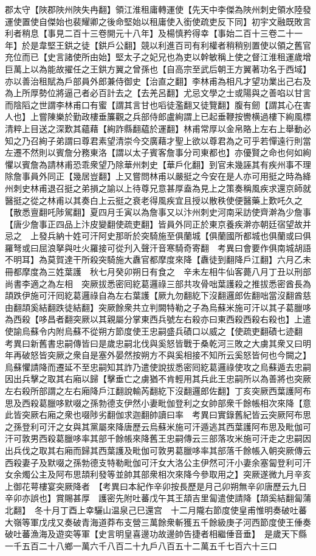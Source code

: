 郡太守【陜郡陜州陜失冉翻】領江淮租庸轉運使【先天中李傑為陜州刺史領水陸發運使置使自傑始也裴耀卿之後命堅始以租庸使入銜使疏吏反下同】初宇文融既敗言利者稍息【事見二百十三卷開元十八年】及楊慎矜得幸【事始二百十三卷二十一年】於是韋堅王鉷之徒【鉷戶公翻】競以利進百司有利權者稍稍别置使以領之舊官充位而已【史言諸使所由始】堅太子之妃兄也為吏以幹敏稱上使之督江淮租運歲增巨萬上以為能故擢任之王鉷方翼之曾孫也【自高宗至武后朝王方翼著功名于西域】亦以善治租賦為戶部員外郎兼侍御史【治直之翻】李林甫為相凡才望功業出己右及為上所厚勢位將逼己者必百計去之【去羌呂翻】尤忌文學之士或陽與之善啗以甘言而陰䧟之世謂李林甫口有蜜【謂其言甘也㗖徒濫翻又徒覽翻】腹有劒【謂其心在害人也】上嘗陳樂於勤政樓垂簾觀之兵部侍郎盧絢謂上已起垂鞭按轡横過樓下絢風標清粹上目送之深歎其蘊藉【絢詐縣翻藴於運翻】林甫常厚以金帛賂上左右上舉動必知之乃召絢子弟謂曰尊君素望清崇今交廣藉才聖上欲以尊君為之可乎若憚遠行則當左遷不然則以賓詹分務東洛【謂以太子賓客詹事分司東都也】亦優賢之命也何如絢懼以賓詹為請林甫恐乖衆望乃除華州刺史【華戶化翻】到官未幾誣其有疾州事不理除詹事員外同正【幾居豈翻】上又嘗問林甫以嚴挺之今安在是人亦可用挺之時為絳州刺史林甫退召挺之弟損之諭以上待尊兄意甚厚盍為見上之策奏稱風疾求還京師就醫挺之從之林甫以其奏白上云挺之衰老得風疾宜且授以散秩使便醫藥上歎吒久之【散悉亶翻吒陟駕翻】夏四月壬寅以為詹事又以汴州刺史河南采訪使齊澣為少詹事【唐少詹事正四品上汴皮變翻使疏吏翻】皆員外同正於東京養疾澣亦朝廷宿望故并忌之　上發兵納十姓可汗阿史那昕於突騎施至俱蘭城【俱蘭國所都城也俱蘭或曰俱羅弩或曰屈浪拏與吐火羅接可從刋入聲汗音寒騎奇寄翻　考異曰會要作俱南城胡語不明耳】為莫賀達干所殺突騎施大纛官都摩度來降【纛徒到翻降戶江翻】六月乙未冊都摩度為三姓葉護　秋七月癸卯朔日有食之　辛未左相牛仙客薨八月丁丑以刑部尚書李適之為左相　突厥拔悉密囘紇葛邏祿三部共攻骨咄葉護殺之推拔悉密酋長為頡跌伊施可汗囘紇葛邏祿自為左右葉護【厥九勿翻紇下沒翻邏郎佐翻咄當沒翻酋慈由翻頡奚結翻跌徒結翻】突厥餘衆共立判闕特勒之子為烏蘇米施可汗以其子葛臘哆為西殺【哆昌者翻突厥以其親屬分掌東西兵號左右殺亦曰東西殺西殺右殺也】上遣使諭烏蘇令内附烏蘇不從朔方節度使王忠嗣盛兵磧口以威之【使疏吏翻磧七迹翻　考異曰新舊書忠嗣傳皆曰是歲忠嗣北伐與奚怒皆戰于桑乾河三敗之大虜其衆又曰明年再破怒皆突厥之衆自是塞外晏然按朔方不與奚相接不知所云奚怒皆何也今闕之】烏蘇懼請降而遷延不至忠嗣知其詐乃遣使說拔悉密囘紇葛邏祿使攻之烏蘇遁去忠嗣因出兵擊之取其右廂以歸【擊垂亡之虜猶不肯輕用其兵此王忠嗣所以為善將也突厥左右殺所部謂之左右廂降戶江翻說輸芮翻紇下沒翻邏郎佐翻】丁亥突厥西葉護阿布思及西殺葛臘哆默啜之孫勃德支伊然小妻毗伽登利之女帥部衆千餘帳相次來降【意此皆突厥右廂之衆也啜陟劣翻伽求迦翻帥讀曰率　考異曰實錄舊紀皆云突厥阿布思之孫登利可汗之女與其黨屬來降唐歷云烏蘇米施可汗遁逃其西葉護阿布思及毗伽可汗可敦男西殺葛臘哆率其部千餘帳來降舊王忠嗣傳云三部落攻米施可汗走之忠嗣因出兵伐之取其右廂而歸其西葉護及毗伽可敦男葛臘哆率其部落千餘帳入朝突厥傳云西殺妻子及默啜之孫勃德支特勒毗伽可汗女大洛公主伊然可汗小妻余塞匐登利可汗女余燭公主及阿布思頡利發等並帥其部衆相次來降今參取用之】突厥遂微九月辛亥上御花萼樓宴突厥降者　【考異曰本紀作辛卯按長歷是月己卯朔無辛卯唐歷云九日辛卯亦誤也】賞賜甚厚　護密先附吐蕃戊午其王頡吉里匐遣使請降【頡奚結翻匐蒲北翻】　冬十月丁酉上幸驪山温泉己巳還宫　十二月隴右節度使皇甫惟明奏破吐蕃大嶺等軍戊戌又奏破青海道莽布支營三萬餘衆斬獲五千餘級庚子河西節度使王倕奏破吐蕃漁海及遊奕等軍【史言明皇喜邊功故邊帥告捷者相繼倕音垂】　是歲天下縣一千五百二十八鄉一萬六千八百二十九戶八百五十二萬五千七百六十三口
